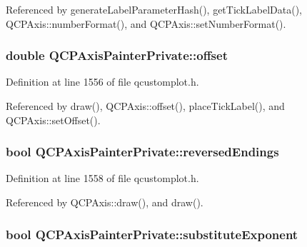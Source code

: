Referenced by generate\+Label\+Parameter\+Hash(), get\+Tick\+Label\+Data(), Q\+C\+P\+Axis\+::number\+Format(), and Q\+C\+P\+Axis\+::set\+Number\+Format().

\hypertarget{class_q_c_p_axis_painter_private_aea226a1e39357d71f66d85093e30a830}{}
\subsubsection[{offset}]{\setlength{\rightskip}{0pt plus 5cm}double Q\+C\+P\+Axis\+Painter\+Private\+::offset}\label{class_q_c_p_axis_painter_private_aea226a1e39357d71f66d85093e30a830}


Definition at line 1556 of file qcustomplot.\+h.



Referenced by draw(), Q\+C\+P\+Axis\+::offset(), place\+Tick\+Label(), and Q\+C\+P\+Axis\+::set\+Offset().

\hypertarget{class_q_c_p_axis_painter_private_a06d0ef3f4f1b567feb84196fc3b140da}{}
\subsubsection[{reversed\+Endings}]{\setlength{\rightskip}{0pt plus 5cm}bool Q\+C\+P\+Axis\+Painter\+Private\+::reversed\+Endings}\label{class_q_c_p_axis_painter_private_a06d0ef3f4f1b567feb84196fc3b140da}


Definition at line 1558 of file qcustomplot.\+h.



Referenced by Q\+C\+P\+Axis\+::draw(), and draw().

\hypertarget{class_q_c_p_axis_painter_private_a546d22b10ddb5ca8582b7deb90223a91}{}
\subsubsection[{substitute\+Exponent}]{\setlength{\rightskip}{0pt plus 5cm}bool Q\+C\+P\+Axis\+Painter\+Private\+::substitute\+Exponent}\label{class_q_c_p_axis_painter_private_a546d22b10ddb5ca8582b7deb90223a91}



